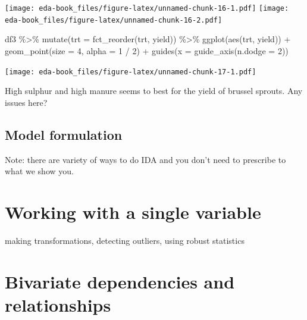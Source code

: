 \documentclass[
]{book}
\newenvironment{Shaded}{\begin{snugshade}}{\end{snugshade}}
\newcommand{\AttributeTok}[1]{\textcolor[rgb]{0.77,0.63,0.00}{#1}}
\newcommand{\DecValTok}[1]{\textcolor[rgb]{0.00,0.00,0.81}{#1}}
\newcommand{\FunctionTok}[1]{\textcolor[rgb]{0.00,0.00,0.00}{#1}}
\newcommand{\NormalTok}[1]{#1}
\newcommand{\SpecialCharTok}[1]{\textcolor[rgb]{0.00,0.00,0.00}{#1}}
\begin{document}
\texttt{[image: eda-book\_files/figure-latex/unnamed-chunk-16-1.pdf]} \texttt{[image: eda-book\_files/figure-latex/unnamed-chunk-16-2.pdf]}

\begin{Shaded}
\begin{Highlighting}[]
\NormalTok{df3 }\SpecialCharTok{\%\textgreater{}\%} 
  \FunctionTok{mutate}\NormalTok{(}\AttributeTok{trt =} \FunctionTok{fct\_reorder}\NormalTok{(trt, yield)) }\SpecialCharTok{\%\textgreater{}\%} 
  \FunctionTok{ggplot}\NormalTok{(}\FunctionTok{aes}\NormalTok{(trt, yield)) }\SpecialCharTok{+} 
  \FunctionTok{geom\_point}\NormalTok{(}\AttributeTok{size =} \DecValTok{4}\NormalTok{, }\AttributeTok{alpha =} \DecValTok{1} \SpecialCharTok{/} \DecValTok{2}\NormalTok{) }\SpecialCharTok{+} 
  \FunctionTok{guides}\NormalTok{(}\AttributeTok{x =} \FunctionTok{guide\_axis}\NormalTok{(}\AttributeTok{n.dodge =} \DecValTok{2}\NormalTok{))}
\end{Highlighting}
\end{Shaded}

\texttt{[image: eda-book\_files/figure-latex/unnamed-chunk-17-1.pdf]}

High sulphur and high manure seems to best for the yield of brussel sprouts. Any issues here?

\hypertarget{model-formulation}{%
\section{Model formulation}\label{model-formulation}}

\begin{info}
Note: there are variety of ways to do IDA and you don't need to
prescribe to what we show you.
\end{info}

\hypertarget{working-with-a-single-variable}{%
\chapter{Working with a single variable}\label{working-with-a-single-variable}}

making transformations, detecting outliers, using robust statistics

\hypertarget{bivariate-dependencies-and-relationships}{%
\chapter{Bivariate dependencies and relationships}\label{bivariate-dependencies-and-relationships}}
\end{document}
